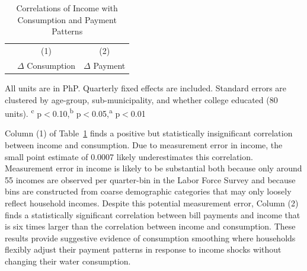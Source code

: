 \documentclass[12pt,table]{article}
\begin{document}
\begin{table}[!ht]
\small
\centering
\begin{threeparttable}
\caption{Correlations of Income with Consumption and Payment Patterns}\label{table:lfsanalysis}
\vspace{-2mm}
\begin{tabular}{lcc}
\toprule
 & \small (1) & \small (2)  \\
 & \small $\Delta$ Consumption & \small $\Delta$ Payment \\[.5em]
 \toprule

\bottomrule
\end{tabular}
\begin{tablenotes}
\footnotesize
\item All units are in PhP.  Quarterly fixed effects are included.  Standard errors are clustered by age-group, sub-municipality, and whether college educated (80 units).  \textsuperscript{c} p$<$0.10,\textsuperscript{b} p$<$0.05,\textsuperscript{a} p$<$0.01 
\end{tablenotes}
\end{threeparttable}
\end{table}

Column (1) of Table~\ref{table:lfsanalysis} finds a positive but statistically insignificant correlation between income and consumption.  Due to measurement error in income, the small point estimate of 0.0007 likely underestimates this correlation.  Measurement error in income is likely to be substantial both because only around 55 incomes are observed per quarter-bin in the Labor Force Survey and because bins are constructed from coarse demographic categories that may only loosely reflect household incomes.  Despite this potential measurement error, Column (2) finds a statistically significant correlation between bill payments and income that is six times larger than the correlation between income and consumption.  These results provide suggestive evidence of consumption smoothing where households flexibly adjust their payment patterns in response to income shocks without changing their water consumption.  


\end{document}
